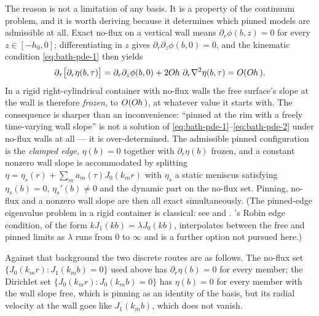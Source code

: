 The reason is not a limitation of any basis. It is a property of the continuum problem, and it is worth deriving because it determines which pinned models are admissible at all. Exact no-flux on a vertical wall means $\partial_r\phi(b,z)=0$ for every $z\in[-h_0,0]$; differentiating in $z$ gives $\partial_r\partial_z\phi(b,0)=0$, and the kinematic condition \eqref{eq:bath-pde-1} then yields
\begin{equation}
    \partial_\tau\big[\partial_r\eta(b,\tau)\big] = \partial_r\partial_z\phi(b,0) + 2O\kern-0.04em h\,\,\partial_r\nabla^2\eta(b,\tau) = O(O\kern-0.04em h\,)\text{.}
    \label{eq:wall-slope-frozen}
\end{equation}
In a rigid right-cylindrical container with no-flux walls the free surface's slope at the wall is therefore \emph{frozen}, to $O(O\kern-0.04em h\,)$, at whatever value it starts with. The consequence is sharper than an inconvenience: ``pinned at the rim with a freely time-varying wall slope'' is not a solution of \eqref{eq:bath-pde-1}--\eqref{eq:bath-pde-2} under no-flux walls at all --- it is over-determined. The admissible pinned configuration is the \emph{clamped edge}, $\eta(b)=0$ together with $\partial_r\eta(b)$ frozen, and a constant nonzero wall slope is accommodated by splitting $\eta=\eta_s(r)+\sum_ma_m(\tau)J_0(k_mr)$ with $\eta_s$ a static meniscus satisfying $\eta_s(b)=0$, $\eta_s'(b)\neq0$ and the dynamic part on the no-flux set. Pinning, no-flux and a nonzero wall slope are then all exact simultaneously. (The pinned-edge eigenvalue problem in a rigid container is classical: see \citealt{Scott1979} and \citealt{GrahamEagle1983}. \citealt{Hocking1987}'s Robin edge condition, of the form $kJ_1(kb)=\lambda J_0(kb)$, interpolates between the free and pinned limits as $\lambda$ runs from $0$ to $\infty$ and is a further option not pursued here.)

Against that background the two discrete routes are as follows. The no-flux set $\{J_0(k_mr):J_1(k_mb)=0\}$ used above has $\partial_r\eta(b)=0$ for every member; the Dirichlet set $\{J_0(k_mr):J_0(k_mb)=0\}$ has $\eta(b)=0$ for every member with the wall slope free, which is pinning as an identity of the basis, but its radial velocity at the wall goes like $J_1(k_mb)$, which does not vanish.

